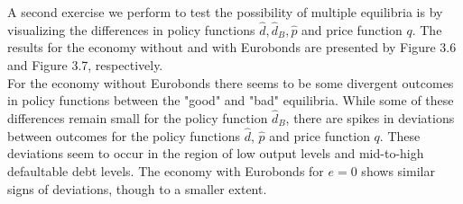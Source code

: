 A second exercise we perform to test the possibility of multiple equilibria is by visualizing the differences in policy functions $\hat{d}, \hat{d}_B, \hat{p}$ and price function $q$. The results for the economy without and with Eurobonds are presented by Figure 3.6 and Figure 3.7, respectively.\\

For the economy without Eurobonds there seems to be some divergent outcomes in policy functions between the "good" and "bad" equilibria. While some of these differences remain small for the policy function $\hat{d}_B$, there are spikes in deviations between outcomes for the policy functions $\hat{d}$, $\hat{p}$ and price function $q$. These deviations seem to occur in the region of low output levels and mid-to-high defaultable debt levels. The economy with Eurobonds for $e = 0$ shows similar signs of deviations, though to a smaller extent.\\

